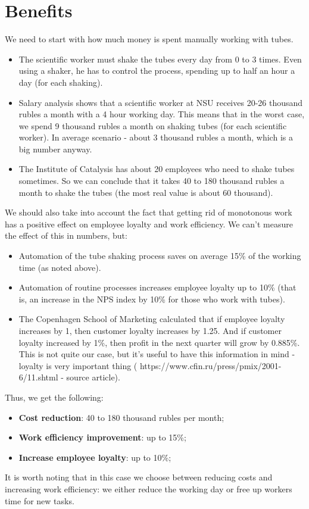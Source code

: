\section{Benefits}

We need to start with how much money is spent manually working with tubes.

\begin{itemize}
\item The scientific worker must shake the tubes every day from 0 to 3 times. Even using a shaker, he has to control the process, spending up to half an hour a day (for each shaking). 

\item Salary analysis shows that a scientific worker at NSU receives 20-26 thousand rubles a month with a 4 hour working day. This means that in the worst case, we spend 9 thousand rubles a month on shaking tubes (for each scientific worker). In average scenario - about 3 thousand rubles a month, which is a big number anyway.

\item The Institute of Catalysis has about 20 employees who need to shake tubes sometimes. So we can conclude that it takes 40 to 180 thousand rubles a month to shake the tubes (the most real value is about 60 thousand).
\end{itemize}
We should also take into account the fact that getting rid of monotonous work has a positive effect on employee loyalty and work efficiency. We can't measure the effect of this in numbers, but: 
\begin{itemize}
    \item Automation of the tube shaking process saves on average 15\% of the working time (as noted above).
    \item Automation of routine processes increases employee loyalty up to 10\% (that is, an increase in the NPS index by 10\% for those who work with tubes). 
    \item The Copenhagen School of Marketing calculated that if employee loyalty increases by 1, then customer loyalty increases by 1.25. And if customer loyalty increased by 1\%, then profit in the next quarter will grow by 0.885\%. This is not quite our case, but it’s useful to have this information in mind - loyalty is very important thing ( https://www.cfin.ru/press/pmix/2001-6/11.shtml - source article).
\end{itemize}
Thus, we get the following:
\begin{itemize}
    \item \textbf{Cost reduction}: 40 to 180 thousand rubles per month;
    \item \textbf{Work efficiency improvement}: up to 15\%;
    \item \textbf{Increase employee loyalty}: up to 10\%;
\end{itemize}
It is worth noting that in this case we choose between reducing costs and increasing work efficiency: we either reduce the working day or free up workers time for new tasks.

